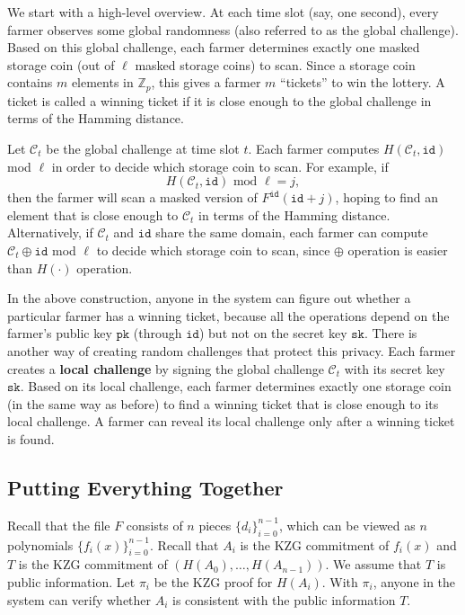 \documentclass[12pt,draftcls,onecolumn]{IEEEtran}
\newcommand{\Fp}{\mathbb{Z}_p}
\newcommand{\sk}{\texttt{sk}}
\newcommand{\pk}{\texttt{pk}}
\newcommand{\id}{\texttt{id}}
\begin{document}
We start with a high-level overview. At each time slot (say, one second), every farmer observes some global randomness (also referred to as the global challenge). 
Based on this global challenge, each farmer determines exactly one masked storage coin (out of $\ell$ masked storage coins) to scan. Since a storage coin contains $m$ elements in $\Fp$, this gives a farmer $m$ ``tickets'' to win the lottery. A ticket is called a winning ticket if it is close enough to the global challenge in terms of the Hamming distance.

Let $\mathcal{C}_t$ be the global challenge at time slot $t$. Each farmer computes $H(\mathcal{C}_t, \id)$ mod $\ell$ in order to decide which storage coin to scan.
For example, if 
\[
H(\mathcal{C}_t, \id) \mbox{ mod } \ell = j,
\]
then the farmer will scan a masked version of $F^{\id}(\id + j)$, hoping to find an element that is close enough to $\mathcal{C}_t$ in terms of the Hamming distance. 
Alternatively, if $\mathcal{C}_t$ and $\id$ share the same domain, each farmer can compute $\mathcal{C}_t \oplus \id$ mod $\ell$ to decide which storage coin to scan, since $\oplus$ operation is easier than $H(\cdot)$ operation. 

In the above construction, anyone in the system can figure out whether a particular farmer has a winning ticket, because all the operations depend on the farmer's public key $\pk$ (through $\id$) but not on the secret key $\sk$.  
There is another way of creating random challenges that protect this privacy. 
Each farmer creates a {\bf local challenge} by signing the global challenge $\mathcal{C}_t$ with its secret key $\sk$. Based on its local challenge, each farmer determines exactly one storage coin (in the same way as before) to find a winning ticket that is close enough to its local challenge. A farmer can reveal its local challenge only after a winning ticket is found.

\subsection{Putting Everything Together}

Recall that the file $F$ consists of $n$ pieces $\{d_i\}_{i = 0}^{n-1}$, which can be viewed as $n$ polynomials $\{ f_i(x) \}_{i = 0}^{n-1}$. Recall that
$A_i$ is the KZG commitment of $f_i(x)$ and $T$ is the KZG commitment of $(H(A_0), \ldots, H(A_{n-1}))$. We assume that $T$ is public information.
Let $\pi_i$ be the KZG proof for $H(A_i)$. With $\pi_i$, anyone in the system can verify whether $A_i$ is consistent with the public information $T$.
\end{document}
